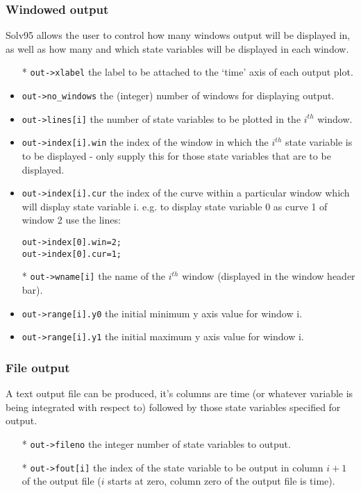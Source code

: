 \documentclass[10pt] {article}
\begin{document}
\subsubsection{Windowed output}
Solv95 allows the user to control how many windows output will be displayed in, as well as how %
many and which state variables will be displayed in each window.
\begin{itemize}
\item[*] \verb+out->xlabel+ the label to be attached to the `time' axis of each output plot.
\item \verb+out->no_windows+ the (integer) number of windows for displaying output.
\item \verb+out->lines[i]+ the number of state variables to be plotted in the $i^{th}$ window.
\item \verb+out->index[i].win+ the index of the window in which the $i^{th}$ state variable is to %
be displayed - only supply this for those state variables that are to be displayed.
\item \verb+out->index[i].cur+ the index of the curve within a particular window which will %
display state variable i. e.g. to display state variable 0 as curve 1 of window 2 use the lines:
\begin{verbatim}
out->index[0].win=2;
out->index[0].cur=1;
\end{verbatim}
\item[*] \verb+out->wname[i]+ the name of the $i^{th}$ window (displayed in the window header %
bar).
\item \verb+out->range[i].y0+ the initial minimum y axis value for window i.
\item \verb+out->range[i].y1+ the initial maximum y axis value for window i.
\end{itemize}
\subsubsection{File output}
A text output file can be produced, it's columns are time (or whatever variable is being %
integrated with respect to) followed by those state variables specified for output. 
\begin{itemize}
\item[*] \verb+out->fileno+ the integer number of state variables to output.
\item[*] \verb+out->fout[i]+ the index of the state variable to be output in column $i+1$ of the %
output file ($i$ starts at zero, column zero of the output file is time). 
\end{itemize}
\end{document}
